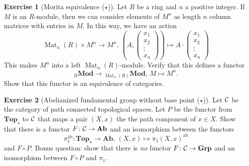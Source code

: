 \documentclass[11pt]{amsbook}
\renewcommand{\ast}{\star}
\DeclareMathOperator\Mod{{\bf{Mod}}}
\DeclareMathOperator\Mat{Mat}
\def\ab{\mathrm{ab}}
\def\Ab{\mathbf{Ab}}
\def\Top{\mathbf{Top}}
\def\Grp{\mathbf{Grp}}
\def\Mod{\mathbf{Mod}}
\theoremstyle{plain}
\theoremstyle{definition}
\newtheorem{exercise}{Exercise}
\begin{document}
\begin{exercise}[Morita equivalence ($\star$)]
Let $R$ be a ring and $n$ a positive integer.  If $M$ is an $R$-module, then we can consider elements of $M^n$ as length $n$ column matrices with entries in $M$. In this way, we have an action
\[
	\Mat_n(R) \times M^n \to M^n,\, (A,    \begin{pmatrix} x_1 \\ x_2 \\ \vdots \\ x_n \end{pmatrix} ) \mapsto
	A \cdot   \begin{pmatrix} x_1 \\ x_2 \\ \vdots \\ x_n \end{pmatrix}
\]
This makes $M^n$ into a left $\Mat_n(R)$-module. Verify that this defines a functor
\[
	{}_R\Mod \to {}_{\Mat_n(R)}\Mod,\, M \mapsto M^n.
\]
Show that this functor is an equivalence of categories.
\end{exercise}





\begin{exercise}[Abelianized fundamental group without base point ($\star$)]
Let ${\mathcal{C}}$ be the category of path connected topological spaces. Let $P$ be the functor
from $\Top_\ast$ to ${\mathcal{C}}$ that maps a pair $(X,x)$ the the path component of $x\in X$.
Show that there is a functor $F\colon \cC \to \Ab$
and an isomorphism between the functors
\[
	\pi_1^\ab \colon \Top_\ast \to \Ab,\, (X,x) \mapsto \pi_1(X,x)^\ab
\]
and $F\circ P$. Bonus question: show that there is \emph{no} functor $F\colon \cC \to \Grp$ and 
an isomorphism between $F\circ P$ and $\pi_1$.
\end{exercise}
\end{document}
